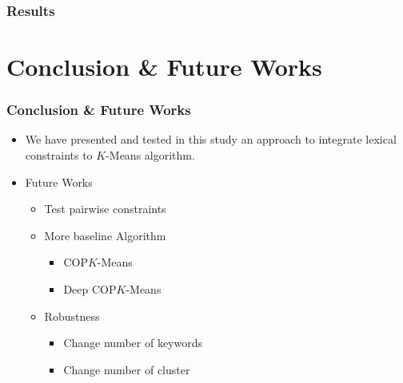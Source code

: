 \documentclass{beamer}
\begin{document}
\begin{frame}
\frametitle{Results}
\begin{table}[!h]
\end{table}
\end{frame}

\section{Conclusion \& Future Works}

\begin{frame}
  \frametitle{Conclusion \& Future Works}
\begin{itemize}
\item We have presented and tested in this study an approach to integrate lexical constraints to $K$-Means algorithm. \pause 
\item Future Works
\begin{itemize}
\item Test pairwise constraints
\item More baseline Algorithm
\begin{itemize}
\item COP$K$-Means
\item Deep COP$K$-Means
\end{itemize}
\item Robustness
\begin{itemize}
\item Change number of keywords
\item Change number of cluster
\end{itemize}
\end{itemize}
\end{itemize}
\end{frame}
\end{document}
